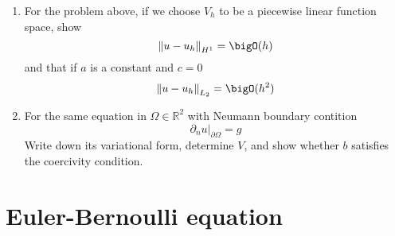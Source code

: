 \documentclass{article}
\newcommand\NoIndent[1]{%
  \begingroup
  \par
  \parshape0
  #1\par
  \endgroup
}
\begin{document}
\begin{enumerate}
\begin{enumerate}
			\item For the problem above, if we choose $V_h$ to be a piecewise linear function space, show
				\begin{equation*}
					\left\|u - u_h\right\|_{H^1} = \bigO(h)
				\end{equation*}
				and that if $a$ is a constant and $c = 0$
				\begin{equation*}
					\left\|u - u_h\right\|_{L_2} = \bigO(h^2)
				\end{equation*}
			\item For the same equation in $\Omega \in \mathbb{R}^2$ with Neumann boundary contition
				\begin{equation*}
					\left.\partial_n u\right|_{\partial\Omega} = g
				\end{equation*}
				Write down its variational form, determine $V$,
				and show whether $b$ satisfies the coercivity condition.
		\end{enumerate}

\NoIndent{\section{Euler-Bernoulli equation}}


\end{enumerate}
\end{document}
